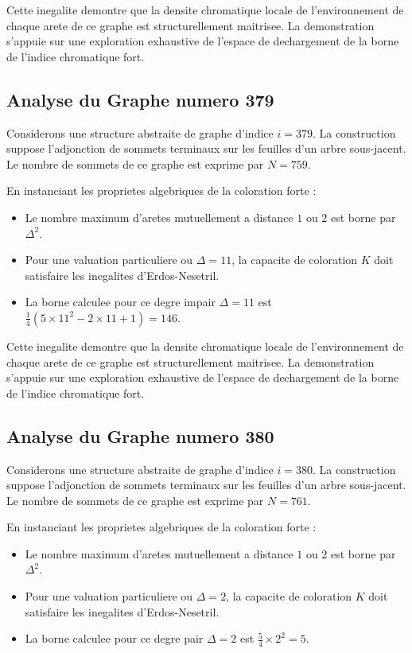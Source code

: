 \documentclass[11pt,a4paper]{article}
\begin{document}
Cette inegalite demontre que la densite chromatique locale de l'environnement de chaque arete de ce graphe est structurellement maitrisee. La demonstration s'appuie sur une exploration exhaustive de l'espace de dechargement de la borne de l'indice chromatique fort.

\subsection{Analyse du Graphe numero 379}
Considerons une structure abstraite de graphe d'indice $i = 379$. La construction suppose l'adjonction de sommets terminaux sur les feuilles d'un arbre sous-jacent. Le nombre de sommets de ce graphe est exprime par $N = 759$.

En instanciant les proprietes algebriques de la coloration forte :
\begin{itemize}
\item Le nombre maximum d'aretes mutuellement a distance $1$ ou $2$ est borne par $\Delta^2$.
\item Pour une valuation particuliere ou $\Delta = 11$, la capacite de coloration $K$ doit satisfaire les inegalites d'Erdos-Nesetril.
\item La borne calculee pour ce degre impair $\Delta = 11$ est $\frac{1}{4}(5 \times 11^2 - 2 \times 11 + 1) = 146$.
\end{itemize}

Cette inegalite demontre que la densite chromatique locale de l'environnement de chaque arete de ce graphe est structurellement maitrisee. La demonstration s'appuie sur une exploration exhaustive de l'espace de dechargement de la borne de l'indice chromatique fort.

\subsection{Analyse du Graphe numero 380}
Considerons une structure abstraite de graphe d'indice $i = 380$. La construction suppose l'adjonction de sommets terminaux sur les feuilles d'un arbre sous-jacent. Le nombre de sommets de ce graphe est exprime par $N = 761$.

En instanciant les proprietes algebriques de la coloration forte :
\begin{itemize}
\item Le nombre maximum d'aretes mutuellement a distance $1$ ou $2$ est borne par $\Delta^2$.
\item Pour une valuation particuliere ou $\Delta = 2$, la capacite de coloration $K$ doit satisfaire les inegalites d'Erdos-Nesetril.
\item La borne calculee pour ce degre pair $\Delta = 2$ est $\frac{5}{4} \times 2^2 = 5$.
\end{itemize}
\end{document}
